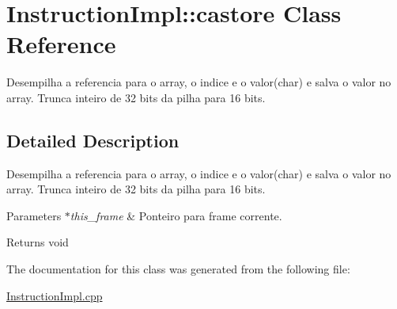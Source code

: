 \hypertarget{class_instruction_impl_1_1castore}{}\section{Instruction\+Impl\+:\+:castore Class Reference}
\label{class_instruction_impl_1_1castore}


Desempilha a referencia para o array, o indice e o valor(char) e salva o valor no array. Trunca inteiro de 32 bits da pilha para 16 bits.  




\subsection{Detailed Description}
Desempilha a referencia para o array, o indice e o valor(char) e salva o valor no array. Trunca inteiro de 32 bits da pilha para 16 bits. 


\begin{DoxyParams}{Parameters}
{\em $\ast$this\+\_\+frame} & Ponteiro para frame corrente. \\
\hline
\end{DoxyParams}
\begin{DoxyReturn}{Returns}
void 
\end{DoxyReturn}


The documentation for this class was generated from the following file\+:\begin{DoxyCompactItemize}
\item 
\hyperlink{_instruction_impl_8cpp}{Instruction\+Impl.\+cpp}\end{DoxyCompactItemize}
